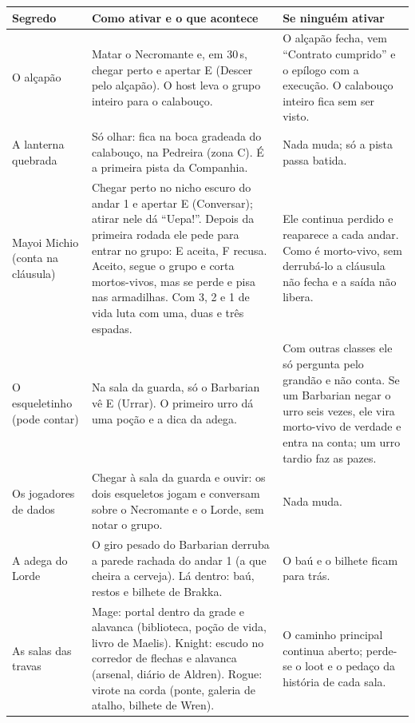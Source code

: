 \documentclass[11pt,a4paper]{article}
\begin{document}
\begin{xltabular}{\textwidth}{@{}>{\raggedright\arraybackslash}p{2.6cm}>{\raggedright\arraybackslash}X>{\raggedright\arraybackslash}X@{}}
\toprule
\textbf{Segredo} & \textbf{Como ativar e o que acontece} & \textbf{Se ninguém ativar} \\
\midrule
O alçapão & Matar o Necromante e, em 30\,s, chegar perto e apertar E (Descer pelo alçapão). O host leva o grupo inteiro para o calabouço. & O alçapão fecha, vem ``Contrato cumprido'' e o epílogo com a execução. O calabouço inteiro fica sem ser visto. \\
A lanterna quebrada & Só olhar: fica na boca gradeada do calabouço, na Pedreira (zona C). É a primeira pista da Companhia. & Nada muda; só a pista passa batida. \\
Mayoi Michio \newline (conta na cláusula) & Chegar perto no nicho escuro do andar 1 e apertar E (Conversar); atirar nele dá ``Uepa!''. Depois da primeira rodada ele pede para entrar no grupo: E aceita, F recusa. Aceito, segue o grupo e corta mortos-vivos, mas se perde e pisa nas armadilhas. Com 3, 2 e 1 de vida luta com uma, duas e três espadas. & Ele continua perdido e reaparece a cada andar. Como é morto-vivo, sem derrubá-lo a cláusula não fecha e a saída não libera. \\
O esqueletinho \newline (pode contar) & Na sala da guarda, só o Barbarian vê E (Urrar). O primeiro urro dá uma poção e a dica da adega. & Com outras classes ele só pergunta pelo grandão e não conta. Se um Barbarian negar o urro seis vezes, ele vira morto-vivo de verdade e entra na conta; um urro tardio faz as pazes. \\
Os jogadores de dados & Chegar à sala da guarda e ouvir: os dois esqueletos jogam e conversam sobre o Necromante e o Lorde, sem notar o grupo. & Nada muda. \\
A adega do Lorde & O giro pesado do Barbarian derruba a parede rachada do andar 1 (a que cheira a cerveja). Lá dentro: baú, restos e bilhete de Brakka. & O baú e o bilhete ficam para trás. \\
As salas das travas & Mage: portal dentro da grade e alavanca (biblioteca, poção de vida, livro de Maelis). Knight: escudo no corredor de flechas e alavanca (arsenal, diário de Aldren). Rogue: virote na corda (ponte, galeria de atalho, bilhete de Wren). & O caminho principal continua aberto; perde-se o loot e o pedaço da história de cada sala. \\

\end{xltabular}
\end{document}

